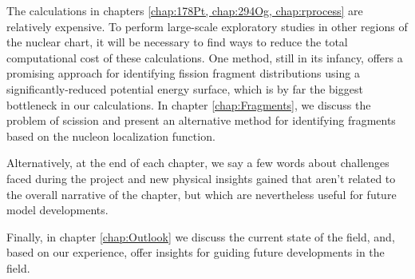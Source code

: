 The calculations in chapters \ref{chap:178Pt, chap:294Og, chap:rprocess} are relatively expensive. To perform large-scale exploratory studies in other regions of the nuclear chart, it will be necessary to find ways to reduce the total computational cost of these calculations. One method, still in its infancy, offers a promising approach for identifying fission fragment distributions using a significantly-reduced potential energy surface, which is by far the biggest bottleneck in our calculations. In chapter \ref{chap:Fragments}, we discuss the problem of scission and present an alternative method for identifying fragments based on the nucleon localization function.

Alternatively, at the end of each chapter, we say a few words about challenges faced during the project and new physical insights gained that aren't related to the overall narrative of the chapter, but which are nevertheless useful for future model developments.

Finally, in chapter \ref{chap:Outlook} we discuss the current state of the field, and, based on our experience, offer insights for guiding future developments in the field.


